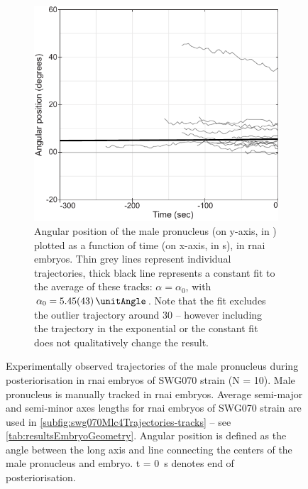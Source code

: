 \begin{figure}
\begin{subfigure}[t]{0.57\textwidth}
    \includegraphics[width=\textwidth]{Results/FigExpMlc4/mlc4Angular.pdf}
    \caption{Angular position of the male pronucleus (on y-axis, in \si{\unitAngle}) plotted as a function of time (on x-axis, in \si{\second}), in  \ac{rnai} embryos. Thin grey lines represent individual trajectories, thick black line represents a constant fit to the average of these tracks: $\alpha = \alpha_0$, with $\alpha_0 = \SI{5.45 +- 0.43}{\unitAngle}$. Note that the fit excludes the outlier trajectory around \SI{30}{\unitAngle} -- however including the trajectory in the exponential or the constant fit does not qualitatively change the result.} 
    \label{subfig:swg070Mlc4Trajectories-angleVsTime}
\end{subfigure}
\caption[Experimentally observed trajectories of the male pronucleus in  \acs{rnai} embryos]{Experimentally observed trajectories of the male pronucleus during posteriorisation in  \ac{rnai} embryos of SWG070 strain (N = 10). Male pronucleus is manually tracked in  \ac{rnai} embryos. Average semi-major and semi-minor axes lengths for  \ac{rnai} embryos of SWG070 strain are used in \autoref{subfig:swg070Mlc4Trajectories-tracks} -- see \autoref{tab:resultsEmbryoGeometry}. Angular position is defined as the angle between the long axis and line connecting the centers of the male pronucleus and embryo. t = \SI{0}{\second} denotes end of posteriorisation.}
\label{fig:swg070Mlc4Trajectories}
\end{figure}

